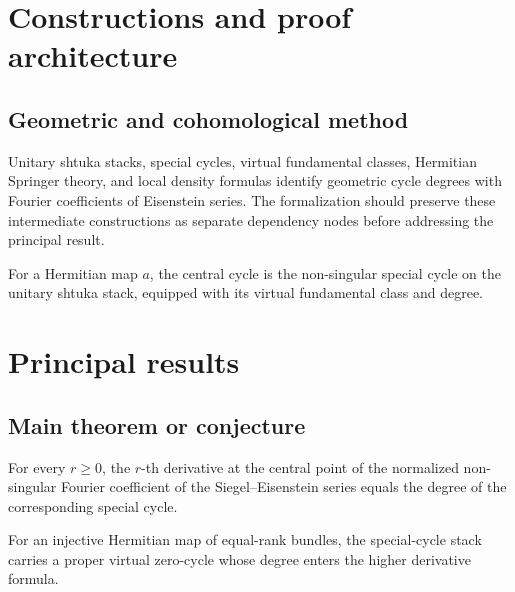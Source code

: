 \chapter{Constructions and proof architecture}
\label{chap:higher-siegel-weil-unitary-nonsingular-terms-method}

\section{Geometric and cohomological method}
\label{sec:higher-siegel-weil-unitary-nonsingular-terms-method}

Unitary shtuka stacks, special cycles, virtual fundamental classes, Hermitian Springer theory, and local density formulas identify geometric cycle degrees with Fourier coefficients of Eisenstein series. The formalization should preserve these intermediate constructions
as separate dependency nodes before addressing the principal result.

\begin{definition}
\label{higher-siegel-weil-unitary-nonsingular-terms-central-object}
For a Hermitian map $a$, the central cycle is the non-singular special cycle on the unitary shtuka stack, equipped with its virtual fundamental class and degree.
\notready
\end{definition}

\chapter{Principal results}
\label{chap:higher-siegel-weil-unitary-nonsingular-terms-results}

\section{Main theorem or conjecture}
\label{sec:higher-siegel-weil-unitary-nonsingular-terms-results}

\begin{theorem}
\label{higher-siegel-weil-unitary-nonsingular-terms-main}
For every $r\geq0$, the $r$-th derivative at the central point of the normalized non-singular Fourier coefficient of the Siegel--Eisenstein series equals the degree of the corresponding special cycle.
\notready
\end{theorem}

\begin{proposition}
\label{higher-siegel-weil-unitary-nonsingular-terms-secondary}
For an injective Hermitian map of equal-rank bundles, the special-cycle stack carries a proper virtual zero-cycle whose degree enters the higher derivative formula.
\notready
\end{proposition}
